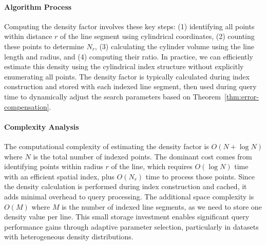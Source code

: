 \documentclass[numbers,sort]{article}
\begin{document}
\paragraph{Algorithm Process} Computing the density factor involves these key steps: (1) identifying all points within distance $r$ of the line segment using cylindrical coordinates, (2) counting these points to determine $N_r$, (3) calculating the cylinder volume using the line length and radius, and (4) computing their ratio. In practice, we can efficiently estimate this density using the cylindrical index structure without explicitly enumerating all points. The density factor is typically calculated during index construction and stored with each indexed line segment, then used during query time to dynamically adjust the search parameters based on Theorem~\ref{thm:error-compensation}.

\paragraph{Complexity Analysis} The computational complexity of estimating the density factor is $O(N + \log N)$ where $N$ is the total number of indexed points. The dominant cost comes from identifying points within radius $r$ of the line, which requires $O(\log N)$ time with an efficient spatial index, plus $O(N_r)$ time to process those points. Since the density calculation is performed during index construction and cached, it adds minimal overhead to query processing. The additional space complexity is $O(M)$ where $M$ is the number of indexed line segments, as we need to store one density value per line. This small storage investment enables significant query performance gains through adaptive parameter selection, particularly in datasets with heterogeneous density distributions.
\end{document}
